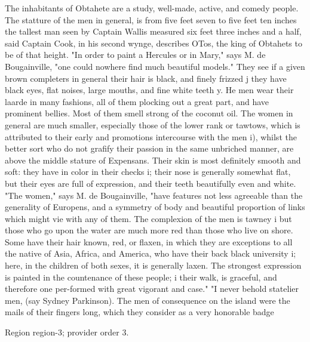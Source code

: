 \documentclass[11pt]{article}
\begin{document}
The inhabitants of Obtahete are a study, well-made, active, and comedy people. The statture of the men in general, is from five feet seven to five feet ten inches the tallest man seen by Captain Wallis measured six feet three inches and a half, said Captain Cook, in his second wynge, describes OTos, the king of Obtahets to be of that height. "In order to paint a Hercules or in Mary," says M. de Bougainville, "one could nowhere find much beautiful models." They see if a given brown completers in general their hair is black, and finely frizzed j they have black eyes, flat noises, large mouths, and fine white teeth y. He men wear their laarde in many fashions, all of them plocking out a great part, and have prominent bellies. Most of them smell strong of the coconut oil. The women in general are much smaller, especially those of the lower rank or tawtows, which is attributed to their early and promotions intercourse with the men i), whilst the better sort who do not grafify their passion in the same unbriched manner, are above the middle stature of Expensans. Their skin is most definitely smooth and soft: they have in color in their checks i; their nose is generally somewhat flat, but their eyes are full of expression, and their teeth beautifully even and white. "The women," says M. de Bougainville, "have features not less agreeable than the generality of Europens, and a symmetry of body and beautiful proportion of links which might vie with any of them. The complexion of the men is tawney i but those who go upon the water are much more red than those who live on shore. Some have their hair known, red, or flaxen, in which they are exceptions to all the native of Asia, Africa, and America, who have their back black university i; here, in the children of both sexes, it is generally laxen. The strongest expression is painted in the countenance of these people; i their walk, is graceful, and therefore one per-formed with great vigorant and case." "I never behold statelier men, (say Sydney Parkinson). The men of consequence on the island were the mails of their fingers long, which they consider as a very honorable badge
\par

{\scriptsize\color{gray} Region region-3; provider order 3.\par}
\medskip
\end{document}
